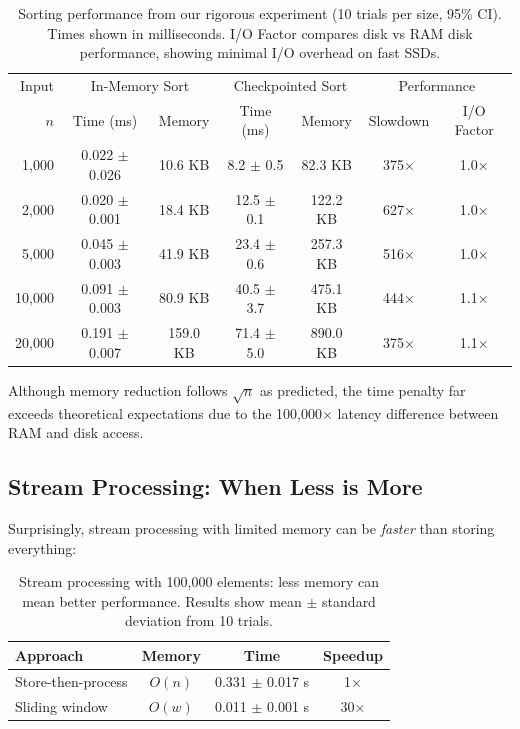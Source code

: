 \documentclass[11pt]{article}
\theoremstyle{definition}
\begin{document}
\begin{table}[ht]
\centering
\begin{tabular}{rcccccc}
\toprule
Input & \multicolumn{2}{c}{In-Memory Sort} & \multicolumn{2}{c}{Checkpointed Sort} & \multicolumn{2}{c}{Performance} \\
\cmidrule(lr){2-3} \cmidrule(lr){4-5} \cmidrule(lr){6-7}
$n$ & Time (ms) & Memory & Time (ms) & Memory & Slowdown & I/O Factor \\
\midrule
1,000 & 0.022 $\pm$ 0.026 & 10.6 KB & 8.2 $\pm$ 0.5 & 82.3 KB & 375× & 1.0× \\
2,000 & 0.020 $\pm$ 0.001 & 18.4 KB & 12.5 $\pm$ 0.1 & 122.2 KB & 627× & 1.0× \\
5,000 & 0.045 $\pm$ 0.003 & 41.9 KB & 23.4 $\pm$ 0.6 & 257.3 KB & 516× & 1.0× \\
10,000 & 0.091 $\pm$ 0.003 & 80.9 KB & 40.5 $\pm$ 3.7 & 475.1 KB & 444× & 1.1× \\
20,000 & 0.191 $\pm$ 0.007 & 159.0 KB & 71.4 $\pm$ 5.0 & 890.0 KB & 375× & 1.1× \\
\bottomrule
\end{tabular}
\caption{Sorting performance from our rigorous experiment (10 trials per size, 95\% CI). Times shown in milliseconds. I/O Factor compares disk vs RAM disk performance, showing minimal I/O overhead on fast SSDs.}
\label{tab:sorting-scaling}
\end{table}

Although memory reduction follows $\sqrt{n}$ as predicted, the time penalty far exceeds theoretical expectations due to the 100,000$\times$ latency difference between RAM and disk access.

\subsection{Stream Processing: When Less is More}

Surprisingly, stream processing with limited memory can be \emph{faster} than storing everything:

\begin{table}[ht]
\centering
\begin{tabular}{lccc}
\toprule
Approach & Memory & Time & Speedup \\
\midrule
Store-then-process & $O(n)$ & 0.331 $\pm$ 0.017 s & 1$\times$ \\
Sliding window & $O(w)$ & 0.011 $\pm$ 0.001 s & 30$\times$ \\
\bottomrule
\end{tabular}
\caption{Stream processing with 100,000 elements: less memory can mean better performance. Results show mean $\pm$ standard deviation from 10 trials.}
\label{tab:streaming}
\end{table}
\end{document}
